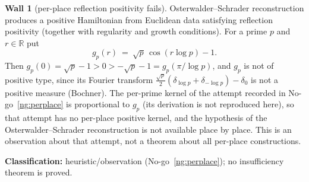 \documentclass[11pt]{amsart}
\theoremstyle{definition}
\theoremstyle{remark}
\theoremstyle{definition}
\newtheorem{obstruction}{Wall}[section]
\newcommand{\R}{\mathbb{R}}
\begin{document}
\begin{obstruction}[per-place reflection positivity fails]\label{ob:perplace}
Osterwalder--Schrader reconstruction produces a positive Hamiltonian from Euclidean data satisfying
reflection positivity (together with regularity and growth conditions). For a prime $p$ and $r\in\R$ put
\[
   g_p(r)\ =\ \sqrt p\,\cos(r\log p)-1 .
\]
Then $g_p(0)=\sqrt p-1>0>-\sqrt p-1=g_p(\pi/\log p)$, and $g_p$ is not of positive type, since its
Fourier transform $\tfrac{\sqrt p}{2}(\delta_{\log p}+\delta_{-\log p})-\delta_0$ is not a positive
measure (Bochner). The per-prime kernel of the attempt recorded in No-go~\ref{ng:perplace} is
proportional to $g_p$ (its derivation is not reproduced here), so that attempt has no per-place positive
kernel, and the hypothesis of the Osterwalder--Schrader reconstruction is not available place by place.
This is an observation about that attempt, not a theorem about all per-place constructions.

\smallskip\noindent\textbf{Classification:} heuristic/observation (No-go~\ref{ng:perplace}); no
insufficiency theorem is proved.
\end{obstruction}
\end{document}
